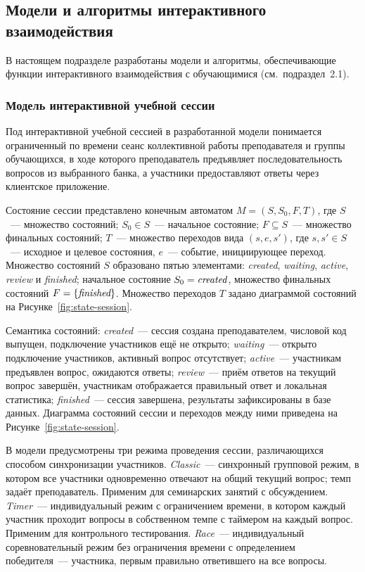 \subsection{Модели и алгоритмы интерактивного взаимодействия}

В настоящем подразделе разработаны модели и алгоритмы,
обеспечивающие функции интерактивного взаимодействия с обучающимися
(см.~подраздел~2.1).

\subsubsection{Модель интерактивной учебной сессии}

Под интерактивной учебной сессией в разработанной модели понимается
ограниченный по времени сеанс коллективной работы преподавателя
и группы обучающихся, в ходе которого преподаватель предъявляет
последовательность вопросов из выбранного банка, а участники
предоставляют ответы через клиентское приложение.

Состояние сессии представлено конечным автоматом
$M = (S, S_0, F, T)$, где $S$~--- множество состояний;
$S_0 \in S$~--- начальное состояние; $F \subseteq S$~--- множество
финальных состояний; $T$~--- множество переходов вида
$(s, e, s')$, где $s, s' \in S$~--- исходное и целевое состояния,
$e$~--- событие, инициирующее переход. Множество состояний $S$
образовано пятью элементами: \emph{created}, \emph{waiting},
\emph{active}, \emph{review} и \emph{finished}; начальное
состояние $S_0 = \emph{created}$, множество финальных состояний
$F = \{\emph{finished}\}$. Множество переходов $T$ задано
диаграммой состояний на Рисунке~\ref{fig:state-session}.

Семантика состояний: \emph{created}~--- сессия создана
преподавателем, числовой код выпущен, подключение участников
ещё не открыто; \emph{waiting}~--- открыто подключение
участников, активный вопрос отсутствует; \emph{active}~---
участникам предъявлен вопрос, ожидаются ответы; \emph{review}~---
приём ответов на текущий вопрос завершён, участникам отображается
правильный ответ и локальная статистика; \emph{finished}~---
сессия завершена, результаты зафиксированы в базе данных.
Диаграмма состояний сессии и переходов между ними приведена
на Рисунке~\ref{fig:state-session}.

В модели предусмотрены три режима проведения сессии, различающихся
способом синхронизации участников. \emph{Classic}~--- синхронный
групповой режим, в котором все участники одновременно отвечают
на общий текущий вопрос; темп задаёт преподаватель. Применим
для семинарских занятий с обсуждением. \emph{Timer}~---
индивидуальный режим с ограничением времени, в котором каждый
участник проходит вопросы в собственном темпе с таймером на каждый
вопрос. Применим для контрольного тестирования.
\emph{Race}~--- индивидуальный соревновательный режим без
ограничения времени с определением победителя~--- участника,
первым правильно ответившего на все вопросы.

